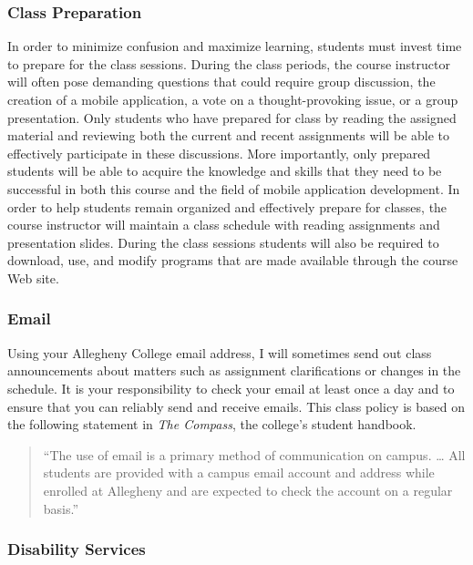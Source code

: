 \subsubsection*{Class Preparation}

In order to minimize confusion and maximize learning, students must invest time to prepare for the class sessions.
During the class periods, the course instructor will often pose demanding questions that could require group discussion,
the creation of a mobile application, a vote on a thought-provoking issue, or a group presentation.  Only students who
have prepared for class by reading the assigned material and reviewing both the current and recent assignments will be
able to effectively participate in these discussions.  More importantly, only prepared students will be able to acquire
the knowledge and skills that they need to be successful in both this course and the field of mobile application
development.  In order to help students remain organized and effectively prepare for classes, the course instructor will
maintain a class schedule with reading assignments and presentation slides.   During the class sessions students will
also be required to download, use, and modify programs that are made available through the course Web site.

\subsubsection*{Email}

Using your Allegheny College email address, I will sometimes send out class announcements about matters such as
assignment clarifications or changes in the schedule. It is your responsibility to check your email at least once a day
and to ensure that you can reliably send and receive emails. This class policy is based on the following statement in
{\em The Compass}, the college's student handbook.

\vspace*{-.1in}
\begin{quote}
``The use of email is a primary method of communication on campus. \ldots
All students are provided with a campus email account and address while
enrolled at Allegheny and are expected to check the account on a regular
basis.'' 
\end{quote}
\vspace*{-.15in}

\subsubsection*{Disability Services}

